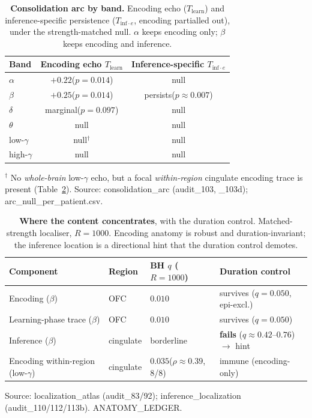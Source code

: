 \documentclass[11pt]{article}
\newcommand{\tab}[1]{Table~\ref{#1}}
\begin{document}
\begin{table}[t]
\centering
\caption{\textbf{Consolidation arc by band.} Encoding echo
($T_{\text{learn}}$) and inference-specific persistence
($T_{\text{inf}\cdot e}$, encoding partialled out), under the strength-matched
null. $\alpha$ keeps encoding only; $\beta$ keeps encoding and inference.}
\label{tab:arc}
\begin{tabular}{lcc}
\toprule
Band & Encoding echo $T_{\text{learn}}$ & Inference-specific $T_{\text{inf}\cdot e}$ \\
\midrule
$\alpha$       & $+0.22$\;($p=0.014$) & null \\
$\beta$        & $+0.25$\;($p=0.014$) & persists\;($p\approx0.007$) \\
$\delta$       & marginal\;($p=0.097$) & null \\
$\theta$       & null & null \\
low-$\gamma$   & null$^{\dagger}$ & null \\
high-$\gamma$  & null & null \\
\bottomrule
\end{tabular}
\par\smallskip
{\footnotesize $^{\dagger}$ No \emph{whole-brain} low-$\gamma$ echo, but a focal
\emph{within-region} cingulate encoding trace is present (\tab{tab:loc}).
Source: consolidation\_arc (audit\_103, \_103d); arc\_null\_per\_patient.csv.}
\end{table}

\begin{table}[t]
\centering
\caption{\textbf{Where the content concentrates}, with the duration control.
Matched-strength localiser, $R=1000$. Encoding anatomy is robust and
duration-invariant; the inference location is a directional hint that the
duration control demotes.}
\label{tab:loc}
\begin{tabular}{llll}
\toprule
Component & Region & BH $q$ ($R{=}1000$) & Duration control \\
\midrule
Encoding ($\beta$)                 & OFC       & $0.010$ & survives ($q=0.050$, epi-excl.) \\
Learning-phase trace ($\beta$)     & OFC       & $0.010$ & survives ($q=0.050$) \\
Inference ($\beta$)                & cingulate & borderline & \textbf{fails} ($q\approx0.42$--$0.76$) $\rightarrow$ hint \\
Encoding within-region (low-$\gamma$) & cingulate & $0.035$\;($\rho{\approx}0.39$, 8/8) & immune (encoding-only) \\
\bottomrule
\end{tabular}
\par\smallskip
{\footnotesize Source: localization\_atlas (audit\_83/92); inference\_localization
(audit\_110/112/113b). ANATOMY\_LEDGER.}
\end{table}
\end{document}
